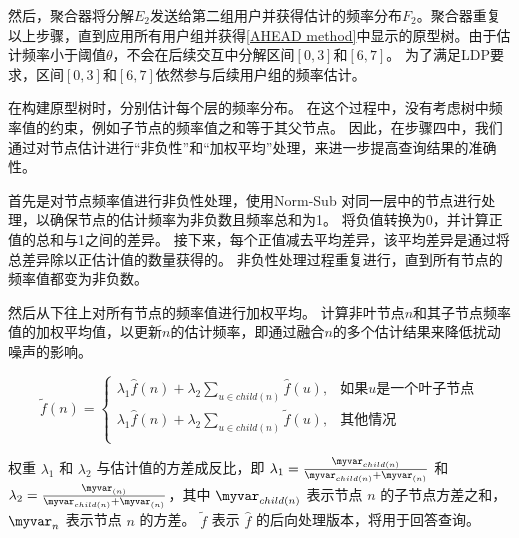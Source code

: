 然后，聚合器将分解$E_{2}$发送给第二组用户并获得估计的频率分布$F_2$。聚合器重复以上步骤，直到应用所有用户组并获得\autoref{AHEAD method}中显示的\myahead 原型树。由于估计频率小于阈值$\theta$，\myahead 不会在后续交互中分解区间$[0,3]$和$[6,7]$。
为了满足LDP要求，区间$[0,3]$和$[6,7]$依然参与后续用户组的频率估计。

在构建原型树时，\myahead 分别估计每个层的频率分布。
在这个过程中，\myahead 没有考虑树中频率值的约束，例如子节点的频率值之和等于其父节点。
因此，在步骤四中，我们通过对节点估计进行“非负性”和“加权平均”处理，来进一步提高\myahead 查询结果的准确性。

首先是对节点频率值进行非负性处理，\myahead 使用Norm-Sub \cite{wang2019consistent}对同一层中的节点进行处理，以确保节点的估计频率为非负数且频率总和为1。
\myahead 将负值转换为0，并计算正值的总和与1之间的差异。
接下来，每个正值减去平均差异，该平均差异是通过将总差异除以正估计值的数量获得的。
非负性处理过程重复进行，直到所有节点的频率值都变为非负数。

然后\myahead 从下往上对所有节点的频率值进行加权平均。
\myahead 计算非叶节点$n$和其子节点频率值的加权平均值，以更新$n$的估计频率，即通过融合$n$的多个估计结果来降低扰动噪声的影响。

\begin{equation}
    \label{weighted average}
    \tilde{f}(n)=\left\{
    \begin{array}{rcl}
    \lambda_1\hat{f}(n) + \lambda_2 \sum_{u \in child(n)}\hat{f}(u), &   \mbox{如果$u$是一个叶子节点} \\
    \lambda_1\hat{f}(n) + \lambda_2 \sum_{u \in child(n)}\tilde{f}(u),    & \mbox{其他情况}  \\
    \end{array}\right.
\end{equation}

权重 $\lambda_1$ 和 $\lambda_2$ 与估计值的方差成反比，即 $\lambda_1 = \frac{\myvar_{child(n)}}{\myvar_{child(n)} + \myvar_{(n)}}$ 和 $\lambda_2 = \frac{\myvar_{(n)}}{\myvar_{child(n)} + \myvar_{(n)}}$，其中 $\myvar_{child(n)}$ 表示节点 $n$ 的子节点方差之和，$\myvar_{n}$ 表示节点 $n$ 的方差。
$\tilde{f}$ 表示 $\hat{f}$ 的后向处理版本，将用于回答查询。

